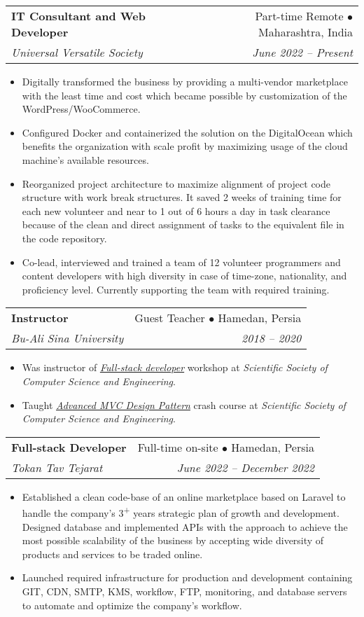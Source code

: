 \documentclass[letterpaper,11pt]{article}
\makeatletter
\newcommand{\resumeItem}[1]{
  \item\small{
    {#1 \vspace{-2pt}}
  }
}
\newcommand{\resumeSubheading}[4]{
  \vspace{-2pt}\item
    \begin{tabular*}{0.97\textwidth}[t]{l@{\extracolsep{\fill}}r}
      \textbf{#1} & #2 \\
      \textit{\small#3} & \textit{\small #4} \\
    \end{tabular*}\vspace{-7pt}
}
\newcommand{\resumeItemListStart}{\begin{itemize}}
\newcommand{\resumeItemListEnd}{\end{itemize}\vspace{-5pt}}
\makeatother
\begin{document}
    \resumeSubheading
      {IT Consultant and Web Developer}{Part-time Remote  $\bullet$ Maharashtra, India}
      {Universal Versatile Society}{June 2022 -- Present}

      \resumeItemListStart
        \resumeItem{Digitally transformed the business by providing a multi-vendor marketplace with the least time and cost which became possible by customization of the WordPress/WooCommerce.}
        \resumeItem{Configured Docker and containerized the solution on the DigitalOcean which benefits the organization with scale profit by maximizing usage of the cloud machine's available resources.}
        \resumeItem{Reorganized project architecture to maximize alignment of project code structure with work break structures. It saved 2 weeks of training time for each new volunteer and near to 1 out of 6 hours a day in task clearance because of the clean and direct assignment of tasks to the equivalent file in the code repository. }
        \resumeItem{Co-lead, interviewed and trained a team of 12 volunteer programmers and content developers with high diversity in case of time-zone, nationality, and proficiency level. Currently supporting the team with required training.}
      \resumeItemListEnd

    \resumeSubheading
      {Instructor}{Guest Teacher $\bullet$ Hamedan, Persia}
      {Bu-Ali Sina University}{2018 -- 2020}

      \resumeItemListStart
        \resumeItem{Was instructor of \href{https://github.com/tayyebi/BASU-Full-Stack-98}{\emph{Full-stack developer}} workshop at \emph{Scientific Society of Computer Science and Engineering}. }
        \resumeItem{Taught \href{https://github.com/tayyebi/BASU-MVC-99}{\emph{Advanced MVC Design Pattern}} crash course at \emph{Scientific Society of Computer Science and Engineering}. }
            
      \resumeItemListEnd

    \resumeSubheading
      {Full-stack Developer}{Full-time on-site $\bullet$ Hamedan, Persia}
      {Tokan Tav Tejarat}{June 2022 -- December 2022}

      \resumeItemListStart
        \resumeItem{Established a clean code-base of an online marketplace based on Laravel to handle the company's 3\textsuperscript{+} years strategic plan of growth and development. Designed database and implemented APIs with the approach to achieve the most possible scalability of the business by accepting wide diversity of products and services to be traded online.}
        \resumeItem{Launched required infrastructure for production and development containing GIT, CDN, SMTP, KMS, workflow, FTP, monitoring, and database servers to automate and optimize the company's workflow.}
      \resumeItemListEnd
\end{document}
